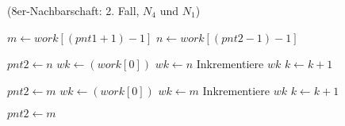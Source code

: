 \begin{algorithm}[!ht]\small
\caption{ (8er-Nachbarschaft: 2. Fall, $N_4$ und $N_1$)}
\label{alg:arlabeling-neighbour-case2-2}
\begin{algorithmic}[1]
	\State $m \gets \mathit{work}\left[\left(\mathit{pnt1} + 1\right) - 1\right]$
	\State $n \gets \mathit{work}\left[\left(\mathit{pnt2} - 1\right) - 1\right]$

		\State $\mathit{pnt2} \gets n$
		\State $\mathit{wk} \gets \left(\mathit{work}\left[0\right]\right)$
				\State $\mathit{wk} \gets n$
			\EndIf
			\State Inkrementiere $\mathit{wk}$
			\State $k \gets k + 1$
		\EndFor

		\State $\mathit{pnt2} \gets m$
		\State $\mathit{wk} \gets \left(\mathit{work}\left[0\right]\right)$
				\State $\mathit{wk} \gets m$
			\EndIf
			\State Inkrementiere $\mathit{wk}$
			\State $k \gets k + 1$
		\EndFor

	\Else
		\State $\mathit{pnt2} \gets m$
	\EndIf
\end{algorithmic}
\end{algorithm}
